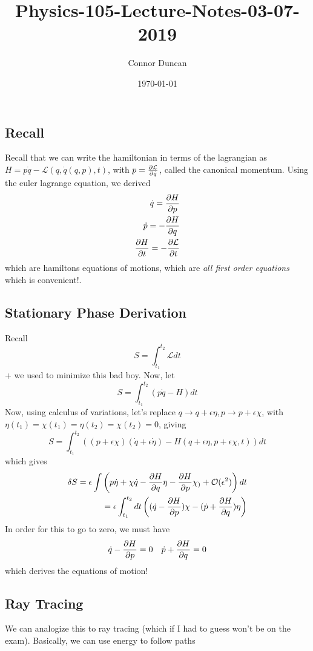 \documentclass{article} \usepackage{amsmath} \usepackage{amssymb} \usepackage{amsthm} \usepackage[margin=0.2in]{geometry} \usepackage{hyperref} \usepackage{physics} \usepackage{tikz} \usepackage{mathtools} \mathtoolsset{showonlyrefs} \theoremstyle{definition} \newtheorem{theorem}{Theorem}[section] \newtheorem{corollary}{Corollary}[theorem] \newtheorem{lemma}[theorem]{Lemma} \newtheorem{definition}{Definition}[section] \author{Connor Duncan} \date{\today}
\title{Physics-105-Lecture-Notes-03-07-2019}
\begin{document}
\maketitle\tableofcontents
\noindent{}
\subsection{Recall} Recall that we can write the hamiltonian in terms of the lagrangian as $H=p\dot q-\mathcal L(q,\dot q(q,p),t)$, with $p=\pdv{\mathcal L}{\dot q}$, called the canonical momentum. Using the euler lagrange equation, we derived \begin{align} \dot q=\pdv{H}{p}\\ \dot p=-\pdv{H}{q}\\ \pdv{H}{t}=-\pdv{\mathcal L}{t} \end{align} which are hamiltons equations of motions, which are \emph{all first order equations} which is convenient!. \subsection{Stationary Phase Derivation} Recall \begin{equation} S=\int_{t_1}^{t_2}\mathcal{L}dt \end{equation} + we used to minimize this bad boy. Now, let \begin{equation} S=\int_{t_1}^{t_2}\left(p\dot q-H\right)dt \end{equation} Now, using calculus of variations, let's replace $q\rightarrow q+\epsilon\eta, p\rightarrow p+\epsilon\chi$, with $\eta(t_1)=\chi(t_1)=\eta(t_2)=\chi(t_2)=0$, giving \begin{equation} S=\int_{t_1}^{t_2}\left(\left(p+\epsilon\chi\right)\left(\dot q+\epsilon\dot\eta\right)-H(q+\epsilon\eta,p+\epsilon\chi,t)\right)dt \end{equation} which gives \begin{align} \delta S=\epsilon\int\left(p\dot\eta+\chi\dot q-\pdv{H}{q}\eta-\pdv{H}{p}\chi_)+\mathcal O(\epsilon^2)\right)dt\\ =\epsilon\int_{t_1}^{t_2}dt\left((\dot q-\pdv{H}{p})\chi-(\dot p+\pdv{H}{q})\eta\right) \end{align} In order for this to go to zero, we must have \begin{align} \dot q-\pdv{H}{p}=0 && \dot p+\pdv{H}{q}=0 \end{align} which derives the equations of motion! \subsection{Ray Tracing} We can analogize this to ray tracing (which if I had to guess won't be on the exam). Basically, we can use energy to follow paths 
\end{document}

